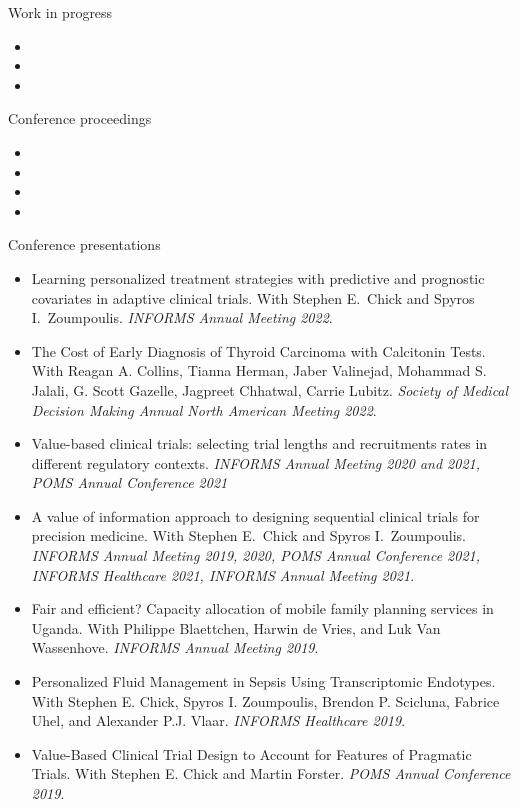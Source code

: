\documentclass{resume}
\begin{document}
\begin{rSection}{Work in progress}
\begin{itemize}
  \item {}
  \item {}
  \item {}
\end{itemize}
\end{rSection}


\begin{rSection}{Conference proceedings}
\begin{itemize}
\item {}
\item {}
\item {}
\item {}
\end{itemize}

\end{rSection}

\begin{rSection}{Conference presentations}

\begin{itemize}
\item Learning personalized treatment strategies with predictive and prognostic covariates in adaptive clinical trials. With Stephen E.\ Chick and Spyros I.\ Zoumpoulis. \textit{INFORMS Annual Meeting 2022}.
\item The Cost of Early Diagnosis of Thyroid Carcinoma with Calcitonin Tests. With Reagan A. Collins, Tianna Herman, Jaber Valinejad, Mohammad S. Jalali, G. Scott Gazelle, Jagpreet Chhatwal, Carrie Lubitz. \textit{Society of Medical Decision Making Annual North American Meeting 2022}.
\item Value-based clinical trials: selecting trial lengths and recruitments rates in different regulatory contexts. \textit{INFORMS Annual Meeting 2020 and 2021, POMS Annual Conference 2021}
\item A value of information approach to designing sequential clinical trials for precision medicine. With Stephen E.\ Chick and Spyros I.\ Zoumpoulis. \textit{INFORMS Annual Meeting 2019, 2020, POMS Annual Conference 2021, INFORMS Healthcare 2021, INFORMS Annual Meeting 2021}.
\item Fair and efficient? Capacity allocation of mobile family planning services in Uganda. With Philippe Blaettchen, Harwin de Vries, and Luk Van Wassenhove. \textit{INFORMS Annual Meeting 2019}.
\item Personalized Fluid Management in Sepsis Using Transcriptomic Endotypes. With Stephen E. Chick, Spyros I. Zoumpoulis, Brendon P. Scicluna, Fabrice Uhel, and Alexander P.J. Vlaar. \textit{INFORMS Healthcare 2019}.
\item Value-Based Clinical Trial Design to Account for Features of Pragmatic Trials. With Stephen E. Chick and Martin Forster. \textit{POMS Annual Conference 2019}.
\end{itemize}

\end{rSection}
\end{document}
